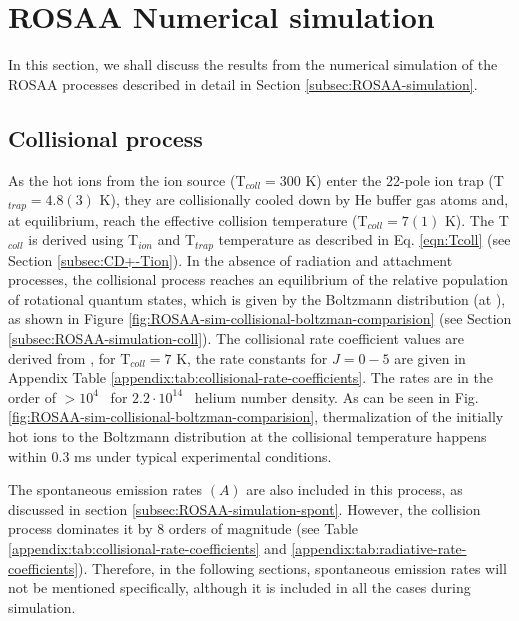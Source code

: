 \section{ROSAA Numerical simulation}
\label{subsec:CD+-kinetics-simulation}

In this section, we shall discuss the results from the numerical simulation of
the ROSAA processes described in detail in Section
\ref{subsec:ROSAA-simulation}.

\subsection{Collisional process}
\label{subsec:CD+-kinetics-simulation-coll}

As the hot \CD ions from the ion source (T$_{coll}=300$ K) enter the 22-pole
ion trap (T$_{trap}=4.8(3)$ K), they are collisionally cooled down by He buffer
gas atoms and, at equilibrium, reach the effective collision temperature
(T$_{coll}=7(1)$ K). The T$_{coll}$ is derived using T$_{ion}$ and T$_{trap}$
temperature as described in Eq. \ref{eqn:Tcoll} (see Section
\ref{subsec:CD+-Tion}). In the absence of radiation and attachment processes,
the collisional process reaches an equilibrium of the relative population of
rotational quantum states, which is given by the Boltzmann distribution (at
\Tcoll), as shown in Figure
\ref{fig:ROSAA-sim-collisional-boltzman-comparision} (see Section
\ref{subsec:ROSAA-simulation-coll}). The collisional rate coefficient values
are derived from \citet{Werfelli2017}, for T$_{coll}=7$ K, the rate constants
for $J=0-5$ are given in Appendix Table
\ref{appendix:tab:collisional-rate-coefficients}. The rates are in the order of
$>10^4$ \pers\ for $2.2 \cdot 10^{14}$ \percc\ helium number density. As can be
seen in Fig. \ref{fig:ROSAA-sim-collisional-boltzman-comparision},
thermalization of the initially hot ions to the Boltzmann distribution at the
collisional temperature happens within 0.3 ms under typical experimental
conditions.


The spontaneous emission rates $(A)$ are also included in this process, as discussed in section \ref{subsec:ROSAA-simulation-spont}. However, the collision process dominates it by $8$ orders of magnitude (see Table \ref{appendix:tab:collisional-rate-coefficients} and \ref{appendix:tab:radiative-rate-coefficients}). Therefore, in the following sections, spontaneous emission rates will not be mentioned specifically, although it is included in all the cases during simulation.

